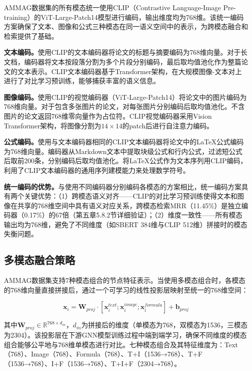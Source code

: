AMMAG数据集的所有模态统一使用CLIP\cite{radford2021clip}（Contrastive Language-Image Pre-training）的ViT-Large-Patch14模型进行编码，输出维度均为768维。该统一编码方案确保了文本、图像和公式三种模态在同一语义空间中的表示，为跨模态融合和检索提供了基础。

\textbf{文本编码。}使用CLIP的文本编码器将论文的标题与摘要编码为768维向量。对于长文档，编码器将文本按段落分割为多个片段分别编码，最后取均值池化作为整篇论文的文本表示。CLIP文本编码器基于Transformer架构，在大规模图像-文本对上进行了对比学习预训练，能够捕获丰富的语义信息。

\textbf{图像编码。}使用CLIP的视觉编码器（ViT-Large-Patch14）将论文中的图片编码为768维向量。对于包含多张图片的论文，对每张图片分别编码后取均值池化。不含图片的论文返回768维零向量作为占位符。CLIP视觉编码器采用Vision Transformer架构，将图像分割为$14\times14$的patch后进行自注意力编码。

\textbf{公式编码。}使用与文本编码器相同的CLIP文本编码器将论文中的LaTeX公式编码为768维向量。编码器从Markdown文本中提取块级公式和行内公式，过滤短公式后取前200条，分别编码后取均值池化。将LaTeX公式作为文本序列用CLIP编码，利用了CLIP文本编码器的通用序列建模能力来处理数学符号。

\textbf{统一编码的优势。}与使用不同编码器分别编码各模态的方案相比，统一编码方案具有两个关键优势：（1）跨模态语义对齐——CLIP的对比学习预训练使得文本和图像在共享的768维空间中具有语义对应关系，跨模态检索MRR（11.45\%）是独立编码器（0.17\%）的67倍（第五章5.8.2节详细验证）；（2）维度一致性——所有模态输出均为768维，避免了不同维度（如SBERT 384维与CLIP 512维）拼接时的模态失衡问题。

\subsection{多模态融合策略}

AMMAG数据集支持7种模态组合的节点特征表示。当使用多模态组合时，各模态的768维向量直接拼接后，通过一个可学习的线性投影层映射至统一的768维空间：

\begin{equation}
\mathbf{x}_i = \mathbf{W}_{proj} \cdot [\mathbf{x}_i^{text}; \mathbf{x}_i^{image}; \mathbf{x}_i^{formula}] + \mathbf{b}_{proj}
\end{equation}

其中$\mathbf{W}_{proj} \in \mathbb{R}^{768 \times d_{in}}$，$d_{in}$为拼接后的维度（单模态为768，双模态为1536，三模态为2304）。该投影层在下游GNN模型训练过程中端到端学习，确保不同维度的模态组合能够公平地与768维单模态进行对比。七种模态组合及其特征维度为：Text（768）、Image（768）、Formula（768）、T+I（1536→768）、T+F（1536→768）、I+F（1536→768）、T+I+F（2304→768）。

